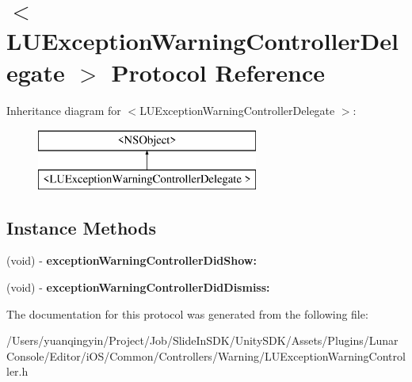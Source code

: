 \hypertarget{protocol_l_u_exception_warning_controller_delegate_01-p}{}\section{$<$L\+U\+Exception\+Warning\+Controller\+Delegate $>$ Protocol Reference}
\label{protocol_l_u_exception_warning_controller_delegate_01-p}
Inheritance diagram for $<$L\+U\+Exception\+Warning\+Controller\+Delegate $>$\+:\begin{figure}[H]
\begin{center}
\leavevmode
\includegraphics[height=2.000000cm]{protocol_l_u_exception_warning_controller_delegate_01-p}
\end{center}
\end{figure}
\subsection*{Instance Methods}
\begin{DoxyCompactItemize}
\item 
\mbox{\label{protocol_l_u_exception_warning_controller_delegate_01-p_a3b9c53d2c4b08b18b5f71adb150019e3}} 
(void) -\/ {\bfseries exception\+Warning\+Controller\+Did\+Show\+:}
\item 
\mbox{\label{protocol_l_u_exception_warning_controller_delegate_01-p_ac8edb83b8cb9d93ab327b9b198277792}} 
(void) -\/ {\bfseries exception\+Warning\+Controller\+Did\+Dismiss\+:}
\end{DoxyCompactItemize}


The documentation for this protocol was generated from the following file\+:\begin{DoxyCompactItemize}
\item 
/\+Users/yuanqingyin/\+Project/\+Job/\+Slide\+In\+S\+D\+K/\+Unity\+S\+D\+K/\+Assets/\+Plugins/\+Lunar\+Console/\+Editor/i\+O\+S/\+Common/\+Controllers/\+Warning/L\+U\+Exception\+Warning\+Controller.\+h\end{DoxyCompactItemize}
